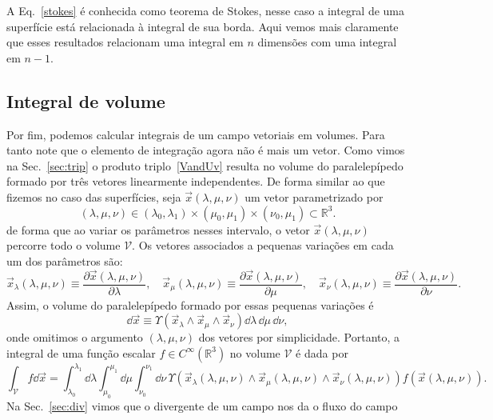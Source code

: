 A Eq.~\eqref{stokes} é conhecida como teorema de Stokes, nesse caso a integral
de uma superfície está relacionada à integral de sua borda. Aqui vemos mais
claramente que esses resultados relacionam uma integral em $n$ dimensões com uma
integral em $n-1$.

\subsection{Integral de volume}
\label{sec:intvol}

Por fim, podemos calcular integrais de um campo vetoriais em volumes. Para tanto
note que o elemento de integração agora não é mais um vetor. Como vimos na
Sec.~\ref{sec:trip} o produto triplo~\eqref{VandUv} resulta no volume do
paralelepípedo formado por três vetores linearmente independentes. De forma
similar ao que fizemos no caso das superfícies, seja $\vec{x}(\lambda,\mu,\nu)$
um vetor parametrizado por
$$(\lambda,\mu,\nu) \in (\lambda_0,\lambda_1)\times(\mu_0,\mu_1)\times(\nu_0,\mu_1) \subset \mathbb{R}^3.$$
de forma que ao variar os parâmetros nesses intervalo, o vetor $
	\vec{x}(\lambda,\mu,\nu) $ percorre todo o volume $\mathcal{V}$. Os vetores
associados a pequenas variações em cada um dos parâmetros são:
\begin{equation}
	\vec{x}_\lambda(\lambda,\mu,\nu) \equiv \frac{\partial\vec{x}(\lambda,\mu,\nu)}{\partial\lambda}, \quad
	\vec{x}_\mu(\lambda,\mu,\nu) \equiv \frac{\partial\vec{x}(\lambda,\mu,\nu)}{\partial\mu}, \quad
	\vec{x}_\nu(\lambda,\mu,\nu) \equiv \frac{\partial\vec{x}(\lambda,\mu,\nu)}{\partial\nu}.
\end{equation}
Assim, o volume do paralelepípedo formado por essas pequenas variações é
\begin{equation}
	\dd \vec{x} \equiv \Upsilon\left(\vec{x}_\lambda\wedge\vec{x}_\mu\wedge\vec{x}_\nu\right)\dd \lambda\,\dd \mu\,\dd \nu,
\end{equation}
onde omitimos o argumento $(\lambda,\mu,\nu)$ dos vetores por simplicidade.
Portanto, a integral de uma função escalar $f\in C^{\infty}(\mathbb{R}^3)$ no
volume $\mathcal{V}$ é dada por
\begin{equation}
	\int_{\mathcal{V}}f \dd \vec{x} = \int_{\lambda_0}^{\lambda_1}\dd \lambda\int_{\mu_0}^{\mu_1}\dd \mu\int_{\nu_0}^{\nu_1}\dd \nu\, \Upsilon\left(\vec{x}_\lambda(\lambda,\mu,\nu)\wedge\vec{x}_\mu(\lambda,\mu,\nu)\wedge\vec{x}_\nu(\lambda,\mu,\nu)\right)f\left(\vec{x}(\lambda,\mu,\nu)\right).
\end{equation}
Na Sec.~\ref{sec:div} vimos que o divergente de um campo nos da o fluxo do campo
